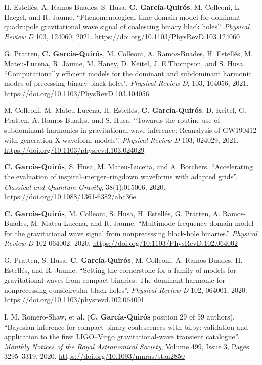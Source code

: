 \begin{cvpubs}
  \cvpub
    {
      \begin{cvetar}
       \item {H. Estellés, A. Ramos-Buades, S. Husa, \textbf{C. García-Quirós}, M. Colleoni, L. Haegel, and R. Jaume. ``Phenomenological time domain model for dominant quadrupole gravitational wave signal of coalescing binary black holes''. \textit{Physical Review D} 103, 124060, 2021. \url{https://doi.org/10.1103/PhysRevD.103.124060}}
       \item {G. Pratten, \textbf{C. García-Quirós}, M. Colleoni, A. Ramos-Buades, H. Estellés, M. Mateu-Lucena, R. Jaume, M. Haney, D. Keitel, J. E.Thompson, and S. Husa. ``Computationally efficient models for the dominant and subdominant harmonic modes of precessing binary black holes''. \textit{Physical Review D}, 103, 104056, 2021. \url{https://doi.org/10.1103/PhysRevD.103.104056}}
       \item {M. Colleoni, M. Mateu-Lucena, H. Estellés, \textbf{C. García-Quirós}, D. Keitel, G. Pratten, A. Ramos-Buades, and S. Husa. ``Towards the routine use of subdominant harmonics in gravitational-wave inference: Reanalysis of GW190412 with generation X waveform models''. \textit{Physical Review D} 103, 024029, 2021. \url{https://doi.org/10.1103/physrevd.103.024029}}
       \item {\textbf{C. García-Quirós}, S. Husa, M. Mateu-Lucena, and A. Borchers. ``Accelerating the evaluation of inspiral–merger–ringdown waveforms with adapted grids''. \textit{Classical and Quantum Gravity}, 38(1):015006, 2020. \url{https://doi.org/10.1088/1361-6382/abc36e}}
       \item{\textbf{C. García-Quirós}, M. Colleoni, S. Husa, H. Estellés, G. Pratten, A. Ramos-Buades, M. Mateu-Lucena, and R. Jaume. ``Multimode frequency-domain model for the gravitational wave signal from nonprecessing black-hole binaries.'' \textit{Physical Review D} 102 064002, 2020. \url{https://doi.org/10.1103/PhysRevD.102.064002}}
       \item {G. Pratten, S. Husa, \textbf{C. García-Quirós}, M. Colleoni, A. Ramos-Buades, H. Estellés, and R. Jaume. ``Setting the cornerstone for a family of models for gravitational waves from compact binaries: The dominant harmonic for nonprecessing quasicircular black holes''. \textit{Physical Review D} 102, 064001, 2020. \url{https://doi.org/10.1103/physrevd.102.064001}}
       \item {I. M. Romero-Shaw, et al. (\textbf{C. García-Quirós} position 29 of 59 authors). ``Bayesian inference for compact binary coalescences with bilby: validation and application to the first LIGO–Virgo gravitational-wave transient catalogue''. \textit{Monthly Notices of the Royal Astronomical Society}, Volume 499, Issue 3, Pages 3295–3319, 2020. \url{https://doi.org/10.1093/mnras/staa2850}}

\end{cvetar}}
\end{cvpubs}
